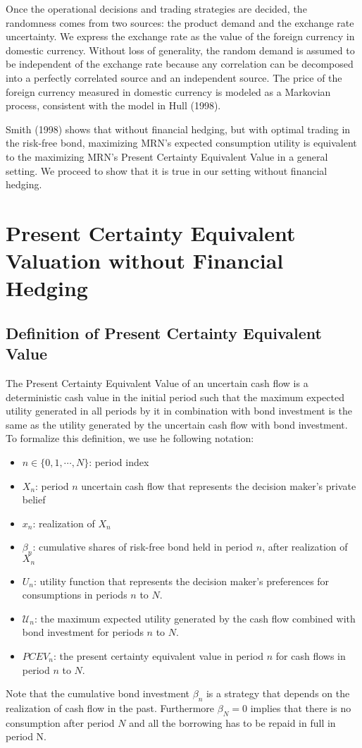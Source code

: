 \documentclass{article}[12pt letter]
\begin{document}
Once the operational decisions and trading strategies are decided, the randomness comes from two sources: the product demand and the exchange rate uncertainty. We express the exchange rate as the value of the foreign currency in domestic currency. Without loss of generality, the random demand is assumed to be independent of the exchange rate because any correlation can be decomposed into a perfectly correlated source and an independent source. The price of the foreign currency measured in domestic currency is modeled as a Markovian process, consistent with the model in Hull (1998).


Smith (1998) shows that without financial hedging, but with optimal trading in the risk-free bond, maximizing MRN's expected consumption utility is equivalent to the maximizing  MRN's Present Certainty Equivalent Value in a general setting. We proceed to show that it is true in our setting without financial hedging.

\section{Present Certainty Equivalent Valuation without Financial Hedging}


\subsection{Definition of Present Certainty Equivalent Value}

The Present Certainty Equivalent Value of an uncertain cash flow is a deterministic cash value in the initial period such that  the maximum expected utility generated in all periods by it in combination with bond investment is the same as the utility generated by the uncertain cash flow with bond investment. To formalize this definition, we use he following notation:
\begin{itemize}
\item $n\in \{0,1, \cdots, N\}$: period index
\item $X_n$: period $n$ uncertain cash flow that represents the decision maker's private belief
\item $x_n$: realization of $X_n$
\item $\beta_n$:  cumulative shares of risk-free bond held in period $n$, after realization of $X_n$
\item $U_n$: utility function that represents the decision maker's preferences for consumptions in periods $n$ to $N$.
\item $\mathcal{U}_n$: the maximum expected utility generated by the cash flow combined with  bond investment for periods $n$ to $N$.
\item $PCEV_n$: the present certainty equivalent value in period $n$ for  cash flows in period $n$ to $N$.
\end{itemize}
Note that the cumulative bond investment $\beta_n$ is a strategy that depends on the realization of cash flow in the past. Furthermore $\beta_N=0$ implies that there is no consumption after period $N$ and all the borrowing has to be repaid in full in period N.
\end{document}

